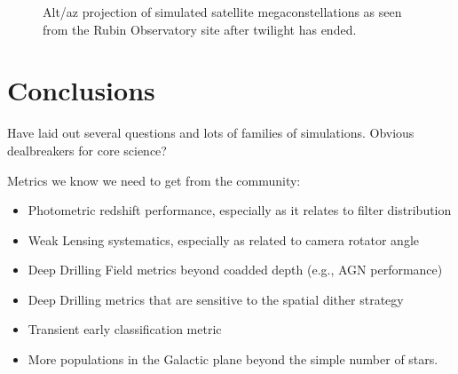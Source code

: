 \begin{figure}
\label{fig:megasat}
\caption{Alt/az projection of simulated satellite megaconstellations as seen from the Rubin Observatory site after twilight has ended. } 
\end{figure}



\section{Conclusions}

Have laid out several questions and lots of families of simulations. Obvious dealbreakers for core science? 

Metrics we know we need to get from the community:
\begin{itemize}
    \item{Photometric redshift performance, especially as it relates to filter distribution}
    \item{Weak Lensing systematics, especially as related to camera rotator angle}
    \item{Deep Drilling Field metrics beyond coadded depth (e.g., AGN performance)}
    \item{Deep Drilling metrics that are sensitive to the spatial dither strategy}
    \item{Transient early classification metric}
    \item{More populations in the Galactic plane beyond the simple number of stars.}
\end{itemize}

